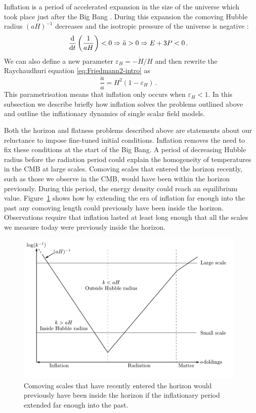 Inflation is a period of accelerated expansion in the size of the universe
which took place just after the Big Bang
\cite{Starobinsky:1980te,Guth:1980zm,Albrecht:1982wi,Linde:1981mu,
Starobinsky:1982ee}. During this
expansion the comoving Hubble radius $(aH)^{-1}$ decreases and the isotropic
pressure of the universe is negative \cite{book:liddle, Baumann2009}:
\begin{equation}
\label{eq:infldefn-intro}
 \frac{\mathrm{d} }{\mathrm{d} t}\left( \frac{1}{aH}\right) <0 \Rightarrow \ddot{a}>0
  \Rightarrow E + 3P < 0 \,.
\end{equation}
We can also define a new parameter $\varepsilon_H = -\dot{H}/H$ and then rewrite
the Raychaudhuri equation \eqref{eq:Friedmann2-intro} as
% 
\begin{equation}
 \label{eq:Friedeps-intro}
 \frac{\ddot{a}}{a} = H^2 (1-\varepsilon_H)\,.
\end{equation}
% 
This parametrisation means that inflation only occurs when $\varepsilon_H<1$.
In this subsection we describe briefly how inflation solves the problems
outlined above and outline the inflationary dynamics of single scalar field
models. 

Both the horizon and flatness problems described above are statements about our
reluctance to impose fine-tuned initial conditions. Inflation removes the need
to fix these conditions at the start of the Big Bang.
A period of decreasing Hubble radius before the radiation period could explain the
homogeneity of temperatures in the CMB at large scales.
Comoving scales that entered the horizon recently, such as
those we observe in the CMB, would have been within the horizon previously. 
During this period, the energy density could reach an equilibrium
value.
Figure~\ref{fig:comovingscales-intro} shows how by extending
the era of inflation far enough into the past any comoving length could
previously have been inside the horizon.
Observations require that inflation lasted at least long enough that all the
scales we measure today were previously inside the horizon. 
% 
\begin{figure}
 \includegraphics[width=\textwidth]{graphs/scales.pdf}
 \caption[Comoving scales and the Hubble radius]{Comoving scales that have recently
entered the horizon would
previously have been inside the horizon if the inflationary period extended far
enough into the past.}
 \label{fig:comovingscales-intro}
\end{figure}
% 

